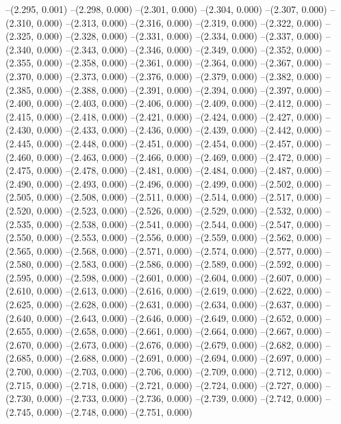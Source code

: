 --(2.295, 0.001)
--(2.298, 0.000)
--(2.301, 0.000)
--(2.304, 0.000)
--(2.307, 0.000)
--(2.310, 0.000)
--(2.313, 0.000)
--(2.316, 0.000)
--(2.319, 0.000)
--(2.322, 0.000)
--(2.325, 0.000)
--(2.328, 0.000)
--(2.331, 0.000)
--(2.334, 0.000)
--(2.337, 0.000)
--(2.340, 0.000)
--(2.343, 0.000)
--(2.346, 0.000)
--(2.349, 0.000)
--(2.352, 0.000)
--(2.355, 0.000)
--(2.358, 0.000)
--(2.361, 0.000)
--(2.364, 0.000)
--(2.367, 0.000)
--(2.370, 0.000)
--(2.373, 0.000)
--(2.376, 0.000)
--(2.379, 0.000)
--(2.382, 0.000)
--(2.385, 0.000)
--(2.388, 0.000)
--(2.391, 0.000)
--(2.394, 0.000)
--(2.397, 0.000)
--(2.400, 0.000)
--(2.403, 0.000)
--(2.406, 0.000)
--(2.409, 0.000)
--(2.412, 0.000)
--(2.415, 0.000)
--(2.418, 0.000)
--(2.421, 0.000)
--(2.424, 0.000)
--(2.427, 0.000)
--(2.430, 0.000)
--(2.433, 0.000)
--(2.436, 0.000)
--(2.439, 0.000)
--(2.442, 0.000)
--(2.445, 0.000)
--(2.448, 0.000)
--(2.451, 0.000)
--(2.454, 0.000)
--(2.457, 0.000)
--(2.460, 0.000)
--(2.463, 0.000)
--(2.466, 0.000)
--(2.469, 0.000)
--(2.472, 0.000)
--(2.475, 0.000)
--(2.478, 0.000)
--(2.481, 0.000)
--(2.484, 0.000)
--(2.487, 0.000)
--(2.490, 0.000)
--(2.493, 0.000)
--(2.496, 0.000)
--(2.499, 0.000)
--(2.502, 0.000)
--(2.505, 0.000)
--(2.508, 0.000)
--(2.511, 0.000)
--(2.514, 0.000)
--(2.517, 0.000)
--(2.520, 0.000)
--(2.523, 0.000)
--(2.526, 0.000)
--(2.529, 0.000)
--(2.532, 0.000)
--(2.535, 0.000)
--(2.538, 0.000)
--(2.541, 0.000)
--(2.544, 0.000)
--(2.547, 0.000)
--(2.550, 0.000)
--(2.553, 0.000)
--(2.556, 0.000)
--(2.559, 0.000)
--(2.562, 0.000)
--(2.565, 0.000)
--(2.568, 0.000)
--(2.571, 0.000)
--(2.574, 0.000)
--(2.577, 0.000)
--(2.580, 0.000)
--(2.583, 0.000)
--(2.586, 0.000)
--(2.589, 0.000)
--(2.592, 0.000)
--(2.595, 0.000)
--(2.598, 0.000)
--(2.601, 0.000)
--(2.604, 0.000)
--(2.607, 0.000)
--(2.610, 0.000)
--(2.613, 0.000)
--(2.616, 0.000)
--(2.619, 0.000)
--(2.622, 0.000)
--(2.625, 0.000)
--(2.628, 0.000)
--(2.631, 0.000)
--(2.634, 0.000)
--(2.637, 0.000)
--(2.640, 0.000)
--(2.643, 0.000)
--(2.646, 0.000)
--(2.649, 0.000)
--(2.652, 0.000)
--(2.655, 0.000)
--(2.658, 0.000)
--(2.661, 0.000)
--(2.664, 0.000)
--(2.667, 0.000)
--(2.670, 0.000)
--(2.673, 0.000)
--(2.676, 0.000)
--(2.679, 0.000)
--(2.682, 0.000)
--(2.685, 0.000)
--(2.688, 0.000)
--(2.691, 0.000)
--(2.694, 0.000)
--(2.697, 0.000)
--(2.700, 0.000)
--(2.703, 0.000)
--(2.706, 0.000)
--(2.709, 0.000)
--(2.712, 0.000)
--(2.715, 0.000)
--(2.718, 0.000)
--(2.721, 0.000)
--(2.724, 0.000)
--(2.727, 0.000)
--(2.730, 0.000)
--(2.733, 0.000)
--(2.736, 0.000)
--(2.739, 0.000)
--(2.742, 0.000)
--(2.745, 0.000)
--(2.748, 0.000)
--(2.751, 0.000)
